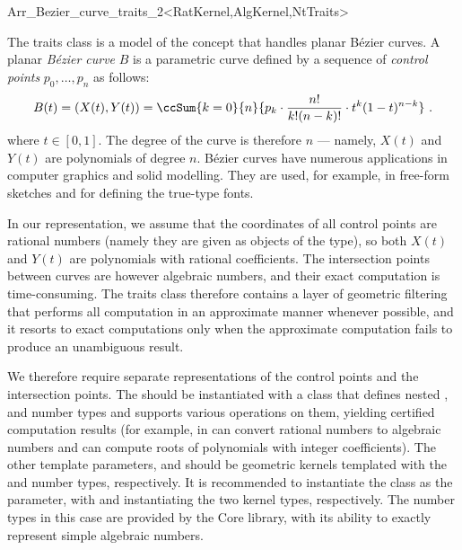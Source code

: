 
\ccRefPageBegin
\begin{ccRefClass}{Arr_Bezier_curve_traits_2<RatKernel,AlgKernel,NtTraits>}

\ccDefinition

The traits class \ccRefName{} is a model of the 
concept that handles planar B\'ezier curves. A planar {\em B\'ezier curve}
$B$ is a parametric curve defined by a sequence of {\em control points}
$p_0, \ldots, p_n$ as follows:
\begin{eqnarray*}
B(t) = \left(X(t), Y(t)\right)
  = \ccSum{k=0}{n}{p_k \cdot \frac{n!}{k! (n-k)!} \cdot
                   t^k (1-t)^{n-k}}\ .
\end{eqnarray*}
where $t \in [0, 1]$. The degree of the curve is therefore $n$ ---
namely, $X(t)$ and $Y(t)$ are polynomials of degree $n$. B\'ezier curves
have numerous applications in computer graphics and solid modelling. They
are used, for example, in free-form sketches and for defining the true-type
fonts.

In our representation, we assume that the coordinates of all control
points are rational numbers (namely they are given as objects of the
 type), so both $X(t)$ and $Y(t)$ are polynomials
with rational coefficients. The intersection points between curves are
however algebraic numbers, and their exact computation is time-consuming.
The traits class therefore contains a layer of geometric filtering that
performs all computation in an approximate manner whenever possible, and
it resorts to exact computations only when the approximate computation
fails to produce an unambiguous result.

We therefore require separate representations of the control points and
the intersection points. The  should be instantiated with a class
that defines nested ,  and  number
types and supports various operations on them, yielding certified computation
results (for example, in can convert rational numbers to algebraic numbers
and can compute roots of polynomials with integer coefficients).
The other template parameters,  and  should be
geometric kernels templated with the  and
 number types, respectively. It is recommended to
instantiate the  class as the 
parameter, with  and
 instantiating the two kernel types,
respectively. The number types in this case are provided by the {\sc Core}
library, with its ability to exactly represent simple algebraic numbers.


\end{ccRefClass}

